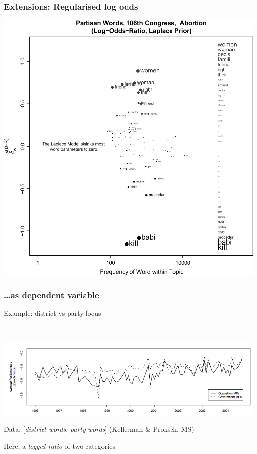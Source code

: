 \documentclass[11pt,compress,professionalfonts]{beamer}
\begin{document}
\begin{frame}[t]\frametitle{Extensions: Regularised log odds}

\centerline{\includegraphics[scale=.2]{pictures/fightin1}}





\end{frame}
\begin{frame}[t]\frametitle{\ldots as dependent variable}

Example: district vs party focus

~\\
\centerline{\includegraphics[scale=.8]{pictures/district-party-focus}}

Data: [\textsl{district words}, \textsl{party words}] (Kellerman \& Proksch, MS)

Here, a \textit{logged ratio} of two categories

\end{frame}
\end{document}
